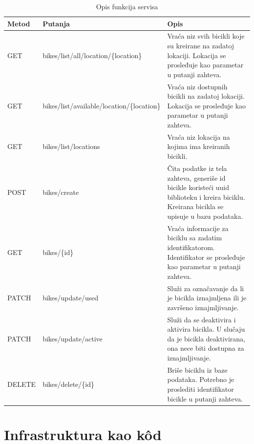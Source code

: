\documentclass[12pt,oneside]{memoir}
\begin{document}
\begin{table}
  \centering
  \caption{Opis funkcija servisa}
  \label{tbl:funkcije}
  \begin{tabular}{|p{2cm}|p{7cm}|p{4cm}|} %
    \hline
      Metod& Putanja & Opis \\
    \hline
    GET & bikes/list/all/location/\{location\} & Vraća niz svih bicikli koje su kreirane na zadatoj lokaciji. Lokacija se prosleđuje kao parametar u putanji zahteva.\\
    GET & bikes/list/available/location/\{location\} & Vraća niz dostupnih bicikli na zadatoj lokaciji. Lokacija se prosleđuje kao parametar u putanji zahteva.\\
    GET & bikes/list/locations & Vraća niz lokacija na kojima ima kreiranih bicikli.\\
    POST & bikes/create & Čita podatke iz tela zahteva, generiše id bicikle koristeći uuid biblioteku i kreira biciklu. Kreirana bicikla se upisuje u bazu podataka.\\
    GET & bikes/\{id\} & Vraća informacije za biciklu sa zadatim identifikatorom. Identifikator se prosleđuje kao parametar u putanji zahteva.\\
    PATCH & bikes/update/used & Služi za označavanje da li je bicikla iznajmljena ili je završeno iznajmljivanje.\\
    PATCH & bikes/update/active & Služi da se deaktivira i aktivira bicikla. U slučaju da je bicikla deaktivirana, ona nece biti dostupna za iznajmljivanje.\\
    DELETE & bikes/delete/\{id\} & Briše biciklu iz baze podataka. Potrebno je proslediti identifikator bicikle u putanji zahteva. \\
    \hline
  \end{tabular}
\end{table}


\section{Infrastruktura kao kôd}
\end{document}
